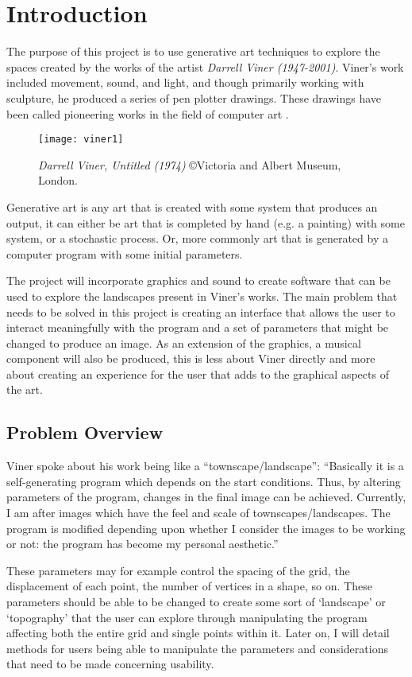 \chapter{Introduction}
The purpose of this project is to use generative art techniques to explore the
spaces created by the works of the artist \emph{Darrell Viner (1947-2001)}. Viner's work
included movement, sound, and light, and though primarily working with
sculpture, he produced a series of pen plotter drawings. These drawings have
been called pioneering works in the field of computer art \citep{viner_bio}.

\begin{figure}[H]
    \texttt{[image: viner1]}
    \centering
    \caption{\emph{Darrell Viner, Untitled (1974)} \copyright Victoria and Albert Museum, London.}
\end{figure}

Generative art is any art that is created with some system that produces
an output, it can either be art that is completed by hand (e.g. a painting)
with some system, or a stochastic process. Or, more commonly art that is
generated by a computer program with some initial parameters.

The project will incorporate graphics and sound to create software that can be
used to explore the landscapes present in Viner's works. The main problem that
needs to be solved in this project is creating an interface that allows the user
to interact meaningfully with the program and a set of parameters that might be
changed to produce an image. As an extension of the graphics, a musical
component will also be produced, this is less about Viner directly and more
about creating an experience for the user that adds to the graphical aspects of
the art.

\section{Problem Overview}
Viner spoke about his work being like a ``townscape/landscape'': 
``Basically it is a self-generating program which depends on the start
conditions. Thus, by altering parameters of the program, changes in the
final image can be achieved. Currently, I am after images which have the feel and
scale of townscapes/landscapes. The program is modified depending upon whether I
consider the images to be working or not: the program has become my personal
aesthetic.'' \cite{viner_artiststatement}

These parameters may for example control the spacing of the grid, the
displacement of each point, the number of vertices in a shape, so on. These
parameters should be able to be changed to create some sort of `landscape' or
`topography' that the user can explore through manipulating the program
affecting both the entire grid and single points within it. Later on, I will
detail methods for users being able to manipulate the parameters and
considerations that need to be made concerning usability.

